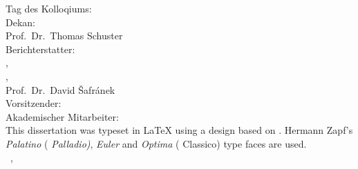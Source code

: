 \thispagestyle{empty}

\hfill
\vfill

{\raggedright
\noindent
Tag des Kolloqiums:  \\
Dekan:\\
\hspace*{20pt}Prof.\ Dr.\ Thomas Schuster\\  
Berichterstatter:\\
\hspace*{20pt}\myProf,\\
\hspace*{20pt}\myOtherProf,\\
\hspace*{20pt}Prof.\ Dr.\ David Šafránek \\
Vorsitzender:  \\
Akademischer Mitarbeiter: \\
\bigskip
\noindent
This dissertation was typeset in \LaTeX{}  using a design based on \texttt{\classicthesis}.
Hermann Zapf's \emph{Palatino} (\emph{ Palladio)}, \emph{Euler} and \emph{Optima} ( Classico) type faces are used.\\
\bigskip
\noindent
\textcopyright\ \myName, \myTime
}
